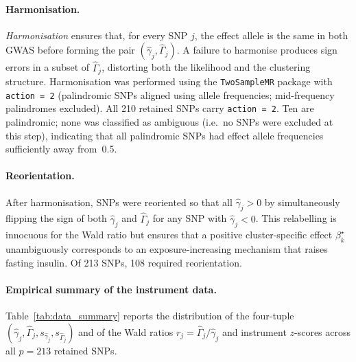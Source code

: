 \documentclass[12pt,a4paper]{article}
\newcommand{\bs}{\beta^{\star}}
\newcommand{\FILLED}[1]{{\color{black}#1}}   %
\begin{document}
\paragraph{Harmonisation.}
\emph{Harmonisation} ensures that, for every SNP $j$, the effect allele is
the same in both GWAS before forming the pair
$(\hat{\gamma}_{j}, \hat{\Gamma}_{j})$.  A failure to harmonise produces
sign errors in a subset of $\hat{\Gamma}_{j}$, distorting both the
likelihood and the clustering structure.  Harmonisation was performed using
the \texttt{TwoSampleMR} package \citep{Hemani2018} with \texttt{action = 2}
(palindromic SNPs aligned using allele frequencies; mid-frequency
palindromes excluded).  \FILLED{All 210 retained SNPs carry
\texttt{action = 2}.  Ten are palindromic; none was classified as ambiguous
(i.e.\ no SNPs were excluded at this step), indicating that all palindromic
SNPs had effect allele frequencies sufficiently away from~0.5.}

\paragraph{Reorientation.}
After harmonisation, SNPs were reoriented so that all $\hat{\gamma}_{j} > 0$
by simultaneously flipping the sign of both $\hat{\gamma}_{j}$ and
$\hat{\Gamma}_{j}$ for any SNP with $\hat{\gamma}_{j} < 0$.  This
relabelling is innocuous for the Wald ratio but ensures that a positive
cluster-specific effect $\bs_{k}$ unambiguously corresponds to an
exposure-increasing mechanism that raises fasting insulin.
\FILLED{Of 213 SNPs, 108 required reorientation.}

\paragraph{Empirical summary of the instrument data.}
Table~\ref{tab:data_summary} reports the distribution of the four-tuple
$(\hat{\gamma}_{j}, \hat{\Gamma}_{j}, s_{\hat{\gamma}_{j}},
s_{\hat{\Gamma}_{j}})$ and of the Wald ratios
$r_{j} = \hat{\Gamma}_{j}/\hat{\gamma}_{j}$ and instrument $z$-scores
across all $p = 213$ retained SNPs.
\end{document}
